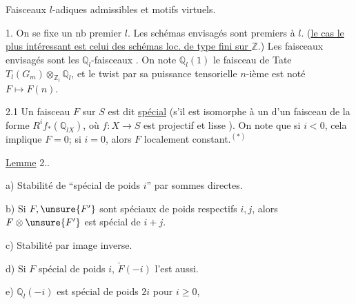 
Faisceaux $l$-adiques admissibles et motifs virtuels.


1. On se fixe un nb premier $l$. Les schémas envisagés sont premiers à $l$. (\uline{le cas le plus intéressant est celui des schémas loc. de type fini sur $\mathbb Z$}.) Les faisceaux envisagés sont les $\mathbb Q_l$-faisceaux . On note $\mathbb Q_l(1)$ le faisceau de Tate $T_l(G_m)\otimes_{\mathbb Z_l}\mathbb Q_l$, et le twist par sa puissance tensorielle $n$-ième est noté $F\longmapsto F(n)$.



2.1 Un faisceau $F$ sur $S$ est dit \uline{spécial}  (s'il est isomorphe à un   d'un  faisceau  de la forme $R^i f_*(\mathbb Q_{lX})$, où $f:X\longrightarrow S$ est projectif et lisse ). On note que si $i<0$, cela implique $F=0$; si $i=0$, alors    $F$ localement constant.$^{(*)}$



\uline{Lemme} 2..

a) Stabilité de ``spécial de poids $i$''  par sommes directes.

b) Si $F,\unsure{F'}$ sont spéciaux de poids respectifs $i,j$, alors $F\otimes \unsure{F'}$ est spécial de $i+j$.

c) Stabilité par image inverse.

d) Si $F$ spécial de poids $i$, $\check F(-i)$ l'est aussi.

e) $\mathbb Q_l(-i)$ est spécial de poids $2i$ pour $i\geq 0$,

